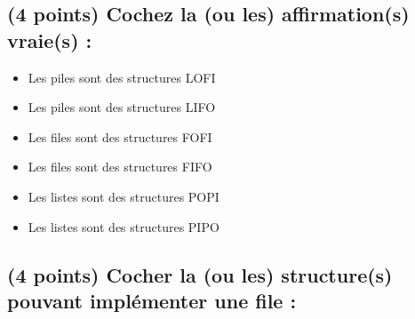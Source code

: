 \documentclass[11pt,a4paper]{article}
\begin{document}
\MakeExamTitle                   %




\renewcommand{\thesubsection}{\arabic{subsection}} %



\vfillFirst

\subsection{(4 points) Cochez la (ou les) affirmation(s) vraie(s) : }

\begin{itemize}
  \item[\CaseCoche] Les piles sont des structures LOFI \\
  \item[\CaseCoche] Les piles sont des structures LIFO \\
  \item[\CaseCoche] Les files sont des structures FOFI \\
  \item[\CaseCoche] Les files sont des structures FIFO \\
  \item[\CaseCoche] Les listes sont des structures POPI \\
  \item[\CaseCoche] Les listes sont des structures PIPO \\
\end{itemize}


\bigskip
\vspace*{1cm}

\subsection{(4 points) Cocher la (ou les) structure(s) pouvant implémenter une file : }
\end{document}
